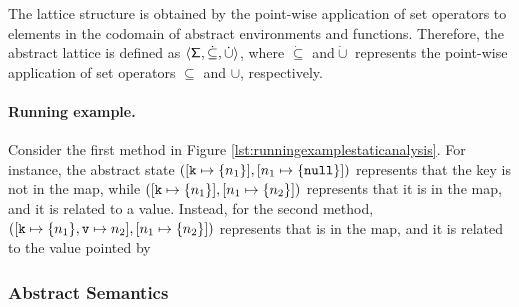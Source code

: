 The lattice structure is obtained by the point-wise application of set operators to elements in the codomain of abstract environments and functions. Therefore, the abstract lattice is defined as $\langle \mathsf{\Sigma}, \dot{\subseteq}, \dot{\cup} \rangle$, where $\dot{\subseteq}$ and$\dot{\cup}$ represents the point-wise application of set operators $\subseteq$ and $\cup$, respectively.

\paragraph{Running example.} 
Consider the first method in Figure \ref{lst:runningexamplestaticanalysis}. For instance, the abstract state $([\mathtt{k} \mapsto \{n_1\}], [n_1 \mapsto \{\mathtt{null}\}])$ represents that the key  is not in the map, while $([\mathtt{k} \mapsto \{n_1\}], [n_1 \mapsto \{n_2\}])$ represents that it is in the map, and it is related to a value. Instead, for the second method, $([\mathtt{k} \mapsto \{n_1\}, \mathtt{v} \mapsto n_2], [n_1 \mapsto \{n_2\}])$ represents that  is in the map, and it is related to the value pointed by 


\subsubsection{Abstract Semantics}
\label{sect:abstractsemantics}

